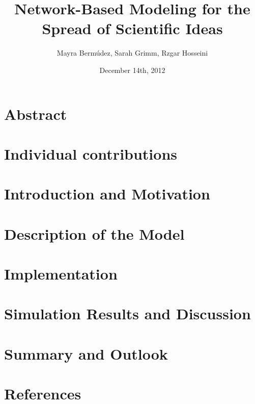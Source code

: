 \documentclass[11pt]{article}
\title{Network-Based Modeling for the Spread of Scientific Ideas}
\author{Mayra Berm\'udez, Sarah Grimm, Rzgar Hosseini}
\date{December 14th, 2012}
\begin{document}

\newpage



\newpage







\tableofcontents

\newpage




\section{Abstract}

\newpage

\section{Individual contributions}

\newpage

\section{Introduction and Motivation}

\newpage

\section{Description of the Model}

\newpage

\section{Implementation}

\newpage

\section{Simulation Results and Discussion}

\newpage

\section{Summary and Outlook}

\newpage

\section{References}



\end{document}
